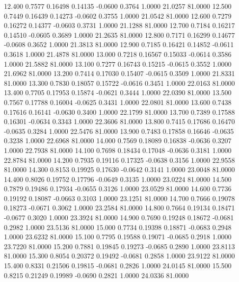  12.400   0.7577   0.16498   0.14135  -0.0600   0.3764   1.0000  21.0257  81.0000
  12.500   0.7449   0.16439   0.14273  -0.0602   0.3755   1.0000  21.0542  81.0000
  12.600   0.7279   0.16272   0.14377  -0.0603   0.3731   1.0000  21.1288  81.0000
  12.700   0.7184   0.16217   0.14510  -0.0605   0.3689   1.0000  21.2635  81.0000
  12.800   0.7171   0.16299   0.14677  -0.0608   0.3652   1.0000  21.3813  81.0000
  12.900   0.7185   0.16421   0.14852  -0.0611   0.3618   1.0000  21.4878  81.0000
  13.000   0.7218   0.16567   0.15033  -0.0614   0.3586   1.0000  21.5882  81.0000
  13.100   0.7277   0.16743   0.15215  -0.0615   0.3552   1.0000  21.6962  81.0000
  13.200   0.7414   0.17030   0.15407  -0.0615   0.3509   1.0000  21.8331  81.0000
  13.300   0.7830   0.18057   0.15722  -0.0616   0.3451   1.0000  22.0163  81.0000
  13.400   0.7705   0.17953   0.15874  -0.0621   0.3444   1.0000  22.0390  81.0000
  13.500   0.7567   0.17788   0.16004  -0.0625   0.3431   1.0000  22.0801  81.0000
  13.600   0.7438   0.17616   0.16141  -0.0630   0.3400   1.0000  22.1799  81.0000
  13.700   0.7389   0.17588   0.16301  -0.0634   0.3343   1.0000  22.3606  81.0000
  13.800   0.7415   0.17686   0.16470  -0.0635   0.3284   1.0000  22.5476  81.0000
  13.900   0.7483   0.17858   0.16646  -0.0635   0.3238   1.0000  22.6968  81.0000
  14.000   0.7569   0.18089   0.16838  -0.0636   0.3207   1.0000  22.7938  81.0000
  14.100   0.7698   0.18434   0.17048  -0.0636   0.3181   1.0000  22.8784  81.0000
  14.200   0.7935   0.19116   0.17325  -0.0638   0.3156   1.0000  22.9558  81.0000
  14.300   0.8153   0.19925   0.17630  -0.0642   0.3141   1.0000  23.0048  81.0000
  14.400   0.8026   0.19752   0.17796  -0.0649   0.3135   1.0000  23.0224  81.0000
  14.500   0.7879   0.19486   0.17934  -0.0655   0.3126   1.0000  23.0529  81.0000
  14.600   0.7736   0.19192   0.18087  -0.0663   0.3103   1.0000  23.1251  81.0000
  14.700   0.7666   0.19078   0.18273  -0.0671   0.3062   1.0000  23.2584  81.0000
  14.800   0.7664   0.19134   0.18471  -0.0677   0.3020   1.0000  23.3924  81.0000
  14.900   0.7690   0.19248   0.18672  -0.0681   0.2982   1.0000  23.5136  81.0000
  15.000   0.7734   0.19398   0.18871  -0.0683   0.2948   1.0000  23.6232  81.0000
  15.100   0.7795   0.19588   0.19071  -0.0685   0.2918   1.0000  23.7220  81.0000
  15.200   0.7881   0.19845   0.19273  -0.0685   0.2890   1.0000  23.8113  81.0000
  15.300   0.8054   0.20372   0.19492  -0.0681   0.2858   1.0000  23.9122  81.0000
  15.400   0.8331   0.21506   0.19815  -0.0681   0.2826   1.0000  24.0145  81.0000
  15.500   0.8215   0.21249   0.19989  -0.0690   0.2821   1.0000  24.0336  81.0000
